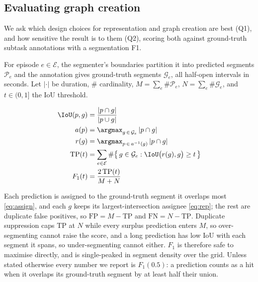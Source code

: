 %
%

\subsection{Evaluating graph creation}

We ask which design choices for representation and graph creation are best (Q1), and how sensitive the result is to them (Q2), scoring both against ground-truth subtask annotations with a segmentation F1.

For episode $e \in \mathcal{E}$, the segmenter's boundaries partition it into predicted segments $\mathcal{P}_e$ and the annotation gives ground-truth segments $\mathcal{G}_e$, all half-open intervals in seconds. Let $\lvert \cdot \rvert$ be duration, $\#$ cardinality, $M = \sum_e \# \mathcal{P}_e$, $N = \sum_e \# \mathcal{G}_e$, and $t \in (0, 1]$ the IoU threshold.

\begin{align}
  \IoU(p, g) &= \frac{\lvert p \cap g \rvert}{\lvert p \cup g \rvert}
    \label{eq:iou} \\
  a(p) &= \argmax_{g \,\in\, \mathcal{G}_e} \, \lvert p \cap g \rvert
    \label{eq:assign} \\
  r(g) &= \argmax_{p \,\in\, a^{-1}(g)} \, \lvert p \cap g \rvert
    \label{eq:rep} \\
  \mathrm{TP}(t) &= \sum_{e \in \mathcal{E}}
    \# \bigl\{\, g \in \mathcal{G}_e : \IoU\bigl(r(g), g\bigr) \ge t \,\bigr\}
    \label{eq:tp} \\
  F_1(t) &= \frac{2\,\mathrm{TP}(t)}{M + N}
    \label{eq:segf1}
\end{align}

Each prediction is assigned to the ground-truth segment it overlaps most \eqref{eq:assign}, and each $g$ keeps its largest-intersection assignee \eqref{eq:rep}; the rest are duplicate false positives, so $\mathrm{FP} = M - \mathrm{TP}$ and $\mathrm{FN} = N - \mathrm{TP}$. Duplicate suppression caps $\mathrm{TP}$ at $N$ while every surplus prediction enters $M$, so over-segmenting cannot raise the score, and a long prediction has low IoU with each segment it spans, so under-segmenting cannot either. $F_1$ is therefore safe to maximise directly, and is single-peaked in segment density over the grid. Unless stated otherwise every number we report is $F_1(0.5)$: a prediction counts as a hit when it overlaps its ground-truth segment by at least half their union.

